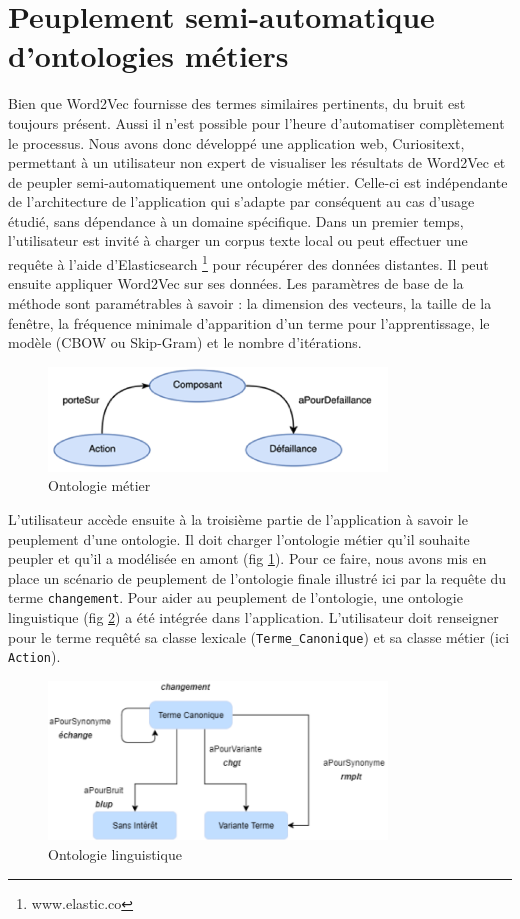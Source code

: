 \section{Peuplement semi-automatique d'ontologies métiers}

Bien que Word2Vec fournisse des termes similaires pertinents, du bruit est toujours présent. Aussi il n'est possible pour l'heure d'automatiser complètement le processus. Nous avons donc développé une application web, Curiositext, permettant à un utilisateur non expert de visualiser les résultats de Word2Vec et de peupler semi-automatiquement une ontologie métier. Celle-ci est indépendante de l'architecture de l'application qui s'adapte par conséquent au cas d'usage étudié, sans dépendance à un domaine spécifique. Dans un premier temps, l'utilisateur est invité à charger un corpus texte local ou peut effectuer une requête à l'aide d'Elasticsearch \footnote{www.elastic.co} pour récupérer des données distantes. Il peut ensuite appliquer Word2Vec sur ses données. Les paramètres de base de la méthode sont paramétrables à savoir : la dimension des vecteurs, la taille de la fenêtre, la fréquence minimale d'apparition d’un terme pour l’apprentissage, le modèle (CBOW ou Skip-Gram) et le nombre d’itérations.
%
\begin{figure}[tb]
    \begin{center}
        \includegraphics[width=9cm]{figures/ontMetier}
    \end{center}
    \caption{Ontologie métier}\label{fig:metier}
\end{figure}
%
L'utilisateur accède ensuite à la troisième partie de l'application à savoir le peuplement d'une ontologie. Il doit charger l’ontologie métier qu'il souhaite peupler et qu'il a modélisée en amont (fig \ref{fig:metier}). Pour ce faire, nous avons mis en place un scénario de peuplement de l'ontologie finale illustré ici par la requête du terme \texttt{changement}.
Pour aider au peuplement de l'ontologie, une ontologie linguistique (fig \ref{fig:ling}) a été intégrée dans l'application. L'utilisateur doit renseigner pour le terme requêté sa classe lexicale (\texttt{Terme\_Canonique}) et sa classe métier (ici \texttt{Action}).
%
\begin{figure}[tb]
    \begin{center}
        \includegraphics[width=9cm]{figures/ontLing}
    \end{center}
    \caption{Ontologie linguistique}\label{fig:ling}
\end{figure}

